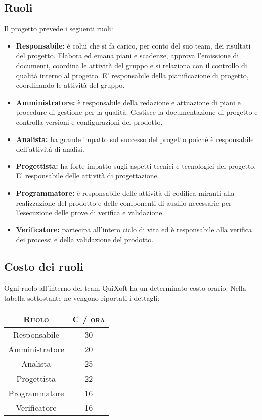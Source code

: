 \documentclass[11pt,a4paper]{article}
\begin{document}
\subsection{Ruoli}
Il progetto prevede i seguenti ruoli:
\begin{itemize}
\item \textbf{Responsabile:} è colui che si fa carico, per conto del suo team, dei risultati del progetto. Elabora ed emana piani e scadenze, approva l'emissione di documenti, coordina le attività del gruppo e si relaziona con il controllo di qualità interno al progetto.
E' responsabile della pianificazione di progetto, coordinando le attività del gruppo.
\item \textbf{Amministratore:} è responsabile della redazione e attuazione di piani e procedure di gestione per la qualità.
Gestisce la documentazione di progetto e controlla versioni e configurazioni del prodotto.
\item \textbf{Analista:} ha grande impatto sul successo del progetto poichè è responsabile dell'attività di analisi.
\item \textbf{Progettista:} ha forte impatto sugli aspetti tecnici e tecnologici del progetto. E' responsabile delle attività di progettazione.
\item \textbf{Programmatore:} è responsabile delle attività di codifica miranti alla realizzazione del prodotto e delle componenti di ausilio necessarie per l'esecuzione delle prove di verifica e validazione.
\item \textbf{Verificatore:}  partecipa all'intero ciclo di vita ed è responsabile alla verifica dei processi e della validazione del prodotto.
\end{itemize}
\subsection{Costo dei ruoli}
Ogni ruolo all'interno del team QuiXoft ha un determinato costo orario. Nella tabella sottostante ne vengono riportati i dettagli:
\medskip
\begin{center}
\begin{tabular}{|c|c|}
\hline
\textsc{Ruolo} & \textsc{\euro \ / ora}\\ \hline \hline
Responsabile & 30 \\ \hline
Amministratore & 20 \\ \hline
Analista & 25 \\ \hline
Progettista & 22 \\ \hline
Programmatore & 16 \\ \hline
Verificatore & 16 \\ \hline
\end{tabular}
\end{center}
\end{document}
